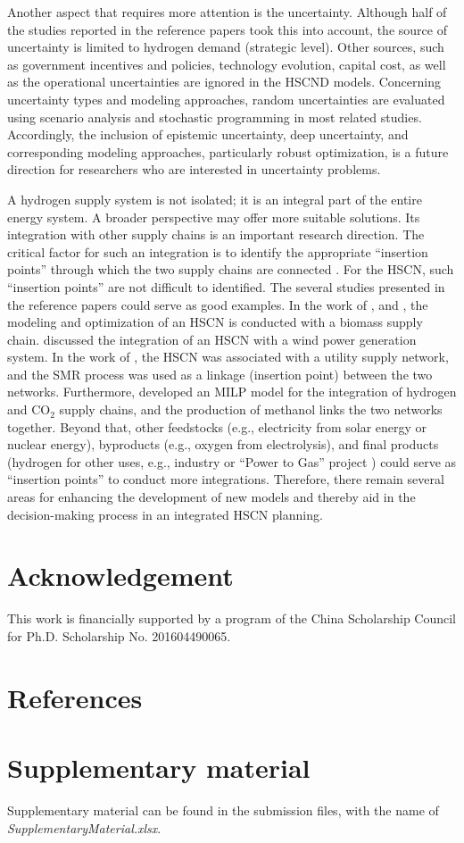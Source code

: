 \documentclass[11pt,3p]{elsarticle}
\begin{document}
Another aspect that requires more attention is the uncertainty. Although half of the studies reported in the reference papers took this into account, the source of uncertainty is limited to hydrogen demand (strategic level). Other sources, such as government incentives and policies, technology evolution, capital cost, as well as the operational uncertainties are ignored in the HSCND models. Concerning uncertainty types and modeling approaches, random uncertainties are evaluated using scenario analysis and stochastic programming in most related studies. Accordingly, the inclusion of epistemic uncertainty, deep uncertainty, and corresponding modeling approaches, particularly robust optimization, is a future direction for researchers who are interested in uncertainty problems. 

A hydrogen supply system is not isolated; it is an integral part of the entire energy system. A broader perspective may offer more suitable solutions. Its integration with other supply chains is an important research direction. The critical factor for such an integration is to identify the appropriate ``insertion points'' through which the two supply chains are connected \citep{yue2014biomass}. For the HSCN, such ``insertion points'' are not difficult to identified. The several studies presented in the reference papers could serve as good examples. In the work of \citet{cho2016optimization,parker2010waste}, and \citet{woo2016optimization}, the modeling and optimization of an HSCN is conducted with a biomass supply chain. \citet{kim2017integrated} discussed the integration of an HSCN with a wind power generation system. In the work of \citet{hwangbo2017mathematical}, the HSCN was associated with a utility supply network, and the SMR process was used as a linkage (insertion point) between the two networks. Furthermore, \citet{bique2018integration} developed an MILP model for the integration of hydrogen and CO$_{2}$ supply chains, and the production of methanol links the two networks together. Beyond that, other feedstocks (e.g., electricity from solar energy or nuclear energy), byproducts (e.g., oxygen from electrolysis), and final products (hydrogen for other uses, e.g., industry or ``Power to Gas'' project \citep{welder2018spatio}) could serve as ``insertion points'' to conduct more integrations. Therefore, there remain several areas for enhancing the development of new models and thereby aid in the decision-making process in an integrated HSCN planning.


\section*{Acknowledgement}
This work is financially supported by a program of the China Scholarship Council for Ph.D. Scholarship No. 201604490065.

\section*{References}


\section*{Supplementary material}
Supplementary material can be found in the submission files, with the name of \\ \textit{SupplementaryMaterial.xlsx}.
\end{document}
